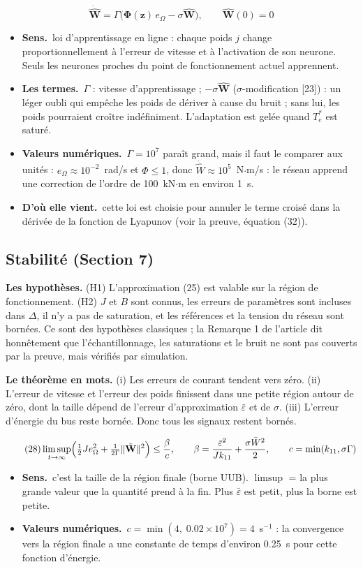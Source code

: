 \documentclass[11pt,a4paper]{article}
\newcommand{\bv}[1]{\mathbf{#1}}
\newenvironment{expl}{\begin{itemize}[leftmargin=1.2em,itemsep=2pt,topsep=2pt]}{\end{itemize}}
\newcommand{\sens}{\item \textbf{Sens.}~}
\newcommand{\termes}{\item \textbf{Les termes.}~}
\newcommand{\origine}{\item \textbf{D'où elle vient.}~}
\newcommand{\num}{\item \textbf{Valeurs numériques.}~}
\begin{document}
\begin{equation}\tag{27}
\dot{\hat{\bv{W}}} = \Gamma\bigl(\boldsymbol\Phi(\bv{z})\,e_\Omega - \sigma\hat{\bv{W}}\bigr),\qquad \hat{\bv{W}}(0)=0
\end{equation}
\begin{expl}
\sens loi d'apprentissage en ligne : chaque poids $j$ change proportionnellement à l'erreur de vitesse et à
l'activation de son neurone. Seuls les neurones proches du point de fonctionnement actuel apprennent.
\termes $\Gamma$ : vitesse d'apprentissage ; $-\sigma\hat{\bv W}$ ($\sigma$-modification [23]) : un léger
\og oubli\fg{} qui empêche les poids de dériver à cause du bruit ; sans lui, les poids pourraient croître
indéfiniment. L'adaptation est gelée quand $T_e^*$ est saturé.
\num $\Gamma=10^7$ paraît grand, mais il faut le comparer aux unités : $e_\Omega\approx10^{-2}$~rad/s et
$\Phi\le1$, donc $\dot{\hat W}\approx10^5$~N$\cdot$m/s : le réseau apprend une correction de l'ordre de
100~kN$\cdot$m en environ 1~s.
\origine cette loi est choisie pour annuler le terme croisé dans la dérivée de la fonction de Lyapunov
(voir la preuve, équation (32)).
\end{expl}

\subsection{Stabilité (Section 7)}
\textbf{Les hypothèses.} (H1) L'approximation (25) est valable sur la région de fonctionnement. (H2) $J$ et
$B$ sont connus, les erreurs de paramètres sont incluses dans $\Delta$, il n'y a pas de saturation, et les
références et la tension du réseau sont bornées. Ce sont des hypothèses classiques ; la Remarque 1 de
l'article dit honnêtement que l'échantillonnage, les saturations et le bruit ne sont pas couverts par la
preuve, mais vérifiés par simulation.

\textbf{Le théorème en mots.} (i) Les erreurs de courant tendent vers zéro. (ii) L'erreur de vitesse et
l'erreur des poids finissent dans une petite région autour de zéro, dont la taille dépend de l'erreur
d'approximation $\bar\varepsilon$ et de $\sigma$. (iii) L'erreur d'énergie du bus reste bornée. Donc tous
les signaux restent bornés.

\begin{equation}\tag{28}
\limsup_{t\to\infty}\Bigl(\tfrac12Je_\Omega^2+\tfrac{1}{2\Gamma}\|\tilde{\bv{W}}\|^2\Bigr)\le\frac{\beta}{c},
\qquad \beta=\frac{\bar\varepsilon^2}{Jk_{11}}+\frac{\sigma\bar W^2}{2},\qquad c=\min(k_{11},\sigma\Gamma)
\end{equation}
\begin{expl}
\sens c'est la taille de la région finale (borne UUB). $\limsup$ = la plus grande valeur que la quantité
prend \og à la fin\fg{}. Plus $\bar\varepsilon$ est petit, plus la borne est petite.
\num $c=\min(4,\;0.02\times10^7)=4$~s$^{-1}$ : la convergence vers la région finale a une constante de
temps d'environ 0.25~s pour cette fonction d'énergie.
\end{expl}
\end{document}
